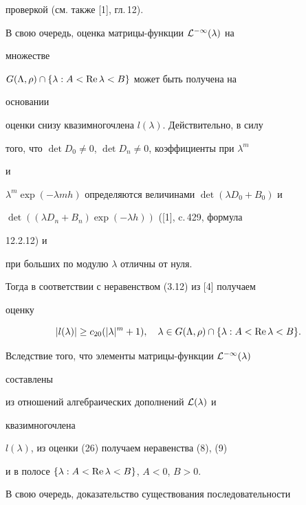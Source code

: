 проверкой (см. также [1], гл.\,12). 


 


В свою очередь, оценка матрицы-функции $\cal L^{-1}(\lambda)$ на 


множестве 


$G(\Lambda,\rho)\cap\{\lambda:A<\operatorname{Re}\lambda<B\}$ может быть получена на 


основании 


оценки снизу квазимногочлена $l(\lambda)$. Действительно, в силу 


того, что $\det D_0\ne0$, $\det D_n\ne0$, коэффициенты при $\lambda^m$ 


и 


$\lambda^m\exp(-\lambda m h)$ определяются величинами $\det(\lambda 


D_0+B_0)$ и 


$\det((\lambda D_n+B_n)\exp(-\lambda h))$ ([1], c.\,429, формула 


12.2.12) и


при больших по модулю $\lambda$ отличны от нуля. 


 


Тогда в соответствии с неравенством (3.12) из [4] получаем 


оценку 


\begin{equation} 


|l(\lambda)|\ge c_{20}(|\lambda|^m+1),\quad 


\lambda\in G(\Lambda,\rho)\cap\{\lambda:A<\re\lambda<B\}. 


\end{equation} 


 


Вследствие того, что элементы матрицы-функции $\cal L^{-1}(\lambda)$ 


составлены 


из отношений алгебраических дополнений $\cal L(\lambda)$ и 


квазимногочлена 


$l(\lambda)$, из оценки (26) получаем неравенства (8), (9) 


и в полосе $\{\lambda:A<\operatorname{Re}\lambda<B\}$, $A<0$, $B>0$. 


 


В свою очередь, доказательство существования последовательности 



